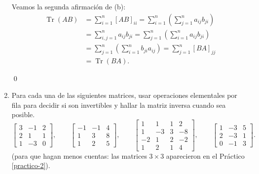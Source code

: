 \begin{enumerate}[topsep=6pt,itemsep=.4cm]
Veamos la segunda afirmación de (b):
\begin{align*}
    \operatorname{Tr}(AB)&=   \sum_{i=1}^n [AB]_{ii} = \sum_{i=1}^n (\sum_{j=1}^n  a_{ij}b_{ji}) \\
    &= \sum_{i,j=1}^n  a_{ij}b_{ji} = \sum_{j=1}^n (\sum_{i=1}^n  a_{ij}b_{ji}) \\
    &=  \sum_{j=1}^n (\sum_{i=1}^n  b_{ji}a_{ij}) =  \sum_{j=1}^n [BA]_{jj} \\
    &= \operatorname{Tr}(BA).
\end{align*}

\qed 

\item\label{ej:inversas} Para cada una de las siguientes matrices, usar operaciones elementales por fila para decidir si son invertibles y hallar la matriz inversa cuando sea posible.
\begin{equation*}
\begin{bmatrix} 3 & -1 & 2 \\ 2 & 1 & 1 \\ 1 & -3 & 0\end{bmatrix},\qquad
\begin{bmatrix} -1 & -1 &4 \\ 1 & 3 & 8 \\ 1 & 2 & 5\end{bmatrix},\qquad
\begin{bmatrix} 1 & 1 & 1 & 2 \\ 1 & -3 & 3 & -8 \\ -2 & 1 & 2 & -2 \\ 1 & 2 & 1 & 4 \end{bmatrix},\qquad
\begin{bmatrix} 1 & -3 & 5 \\ 2 & -3 & 1 \\ 0 & -1 & 3 \end{bmatrix}.
\end{equation*}
(para que hagan menos cuentas: las matrices $3\times3$ aparecieron en el Práctico \ref{practico-2}).
\rta


\end{enumerate}
